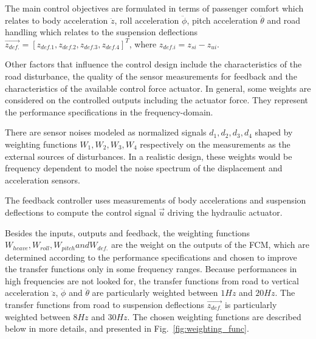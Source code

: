 The main control objectives are formulated in terms of passenger comfort which relates to body acceleration $\ddot{z}$, roll acceleration $\ddot{\phi}$, pitch acceleration $\ddot{\theta}$ and road handling which relates to the suspension deflections $\vec{z_{def.}}=[z_{def.1},z_{def.2},z_{def.3},z_{def.4}]^T$, where $z_{def.i}=z_{si}-z_{ui}$.

Other factors that influence the control design include the characteristics of the road disturbance, the quality of the sensor measurements for feedback and the characteristics of the available control force actuator.
%
In general, some weights are considered on the controlled outputs including the actuator force.
%
They represent the performance specifications in the frequency-domain.

There are sensor noises modeled as normalized signals $d_1, d_2, d_3, d_4$ shaped by weighting functions $W_1,W_2, W_3, W_4$ respectively on the measurements as the external sources of disturbances.
%
In a realistic design, these weights would be frequency dependent to model the noise spectrum of the displacement and acceleration sensors.

The feedback controller uses measurements of body accelerations and suspension deflections to compute the control signal $\vec{u}$ driving the hydraulic actuator.

Besides the inputs, outputs and feedback, the weighting functions $W_{heave}, W_{roll}, W_{pitch} and W_{def.}$ are the weight on the outputs of the \ac{FCM}, which are determined according to the performance specifications and chosen to improve the transfer functions only in some frequency ranges.
%
Because performances in high frequencies are not looked for, the transfer functions from road to vertical acceleration $\ddot{z}$, $\ddot{\phi}$ and $\ddot{\theta}$ are particularly weighted between $1Hz$ and $20Hz$.
%
The transfer functions from road to suspension deflections $\vec{z_{def.}}$ is particularly weighted between $8Hz$ and $30Hz$.
%
The chosen weighting functions are described below in more details, and presented in Fig.~\ref{fig:weighting_func}.

